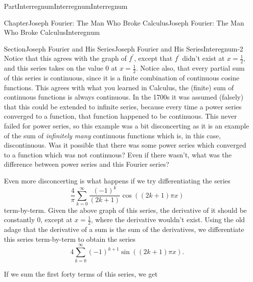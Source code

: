 \documentclass[oneside,10pt,]{book}
\numberwithin{equation}{part}
\begin{document}
\begin{partptx}{Part}{Interregnum}{}{Interregnum}{}{}{Interregnum}
\begin{chapterptx}{Chapter}{Joseph Fourier: The Man Who Broke Calculus}{}{Joseph Fourier: The Man Who Broke Calculus}{}{}{Interegnum}
\begin{sectionptx}{Section}{Joseph Fourier and His Series}{}{Joseph Fourier and His Series}{}{}{Interegnum-2}
Notice that this agrees with the graph of \(f^\prime\), except that \(f^\prime\) didn't exist at \(x=\frac{1}{2}\), and this series takes on the value \(0\) at \(x=\frac{1}{2}\). Notice also, that every partial sum of this series is continuous, since it is a finite combination of continuous cosine functions. This agrees with what you learned in Calculus, the (finite) sum of continuous functions is always continuous.  In the 1700s it was assumed (falsely) that this could be extended to infinite series, because every time a power series converged to a function, that function happened to be continuous.  This never failed for power series, so this example was a bit disconcerting as it is an example of the sum of \emph{infinitely many} continuous functions which is, in this case, discontinuous.  Was it possible that there was some power series which converged to a function which was not continuous?  Even if there wasn't, what was the difference between power series and this Fourier series?%
\par
Even more disconcerting is what happens if we try differentiating the series%
\begin{equation*}
\frac{4}{\pi}\sum_{k=0}^\infty\frac{\left(-1\right)^k}{\left(2k+1\right)} \cos\left(\left(2k+1\right)\pi x\right)
\end{equation*}
term-by-term. Given the above graph of this series, the derivative of it should be constantly 0, except at \(x=\frac{1}{2}\), where the derivative wouldn't exist. Using the old adage that the derivative of a sum is the sum of the derivatives, we differentiate this series term-by-term to obtain the series%
\begin{equation*}
4\sum_{k=0}^\infty\left(-1\right)^{k+1}\sin\left(\left(2k+1\right)\pi x\right)\text{.}
\end{equation*}
%
\par
If we sum the first forty terms of this series, we get         %
\begin{image}{0.125}{0.75}{0.125}{}%

\end{image}
\end{sectionptx}
\end{chapterptx}
\end{partptx}
\end{document}
